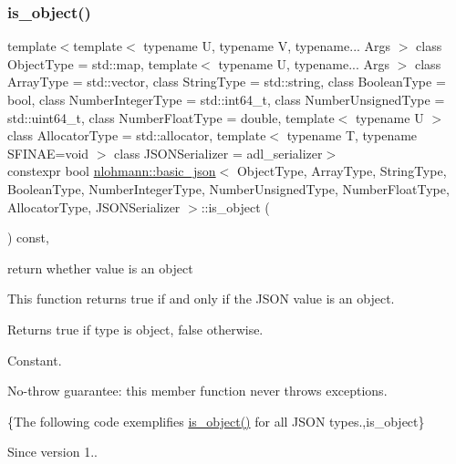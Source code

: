 \subsubsection{\texorpdfstring{is\+\_\+object()}{is\_object()}}
{\footnotesize\ttfamily template$<$template$<$ typename U, typename V, typename... Args $>$ class Object\+Type = std\+::map, template$<$ typename U, typename... Args $>$ class Array\+Type = std\+::vector, class String\+Type  = std\+::string, class Boolean\+Type  = bool, class Number\+Integer\+Type  = std\+::int64\+\_\+t, class Number\+Unsigned\+Type  = std\+::uint64\+\_\+t, class Number\+Float\+Type  = double, template$<$ typename U $>$ class Allocator\+Type = std\+::allocator, template$<$ typename T, typename S\+F\+I\+N\+A\+E=void $>$ class J\+S\+O\+N\+Serializer = adl\+\_\+serializer$>$ \\
constexpr bool \mbox{\hyperlink{classnlohmann_1_1basic__json}{nlohmann\+::basic\+\_\+json}}$<$ Object\+Type, Array\+Type, String\+Type, Boolean\+Type, Number\+Integer\+Type, Number\+Unsigned\+Type, Number\+Float\+Type, Allocator\+Type, J\+S\+O\+N\+Serializer $>$\+::is\+\_\+object (\begin{DoxyParamCaption}{ }\end{DoxyParamCaption}) const\hspace{0.3cm}{\ttfamily [inline]}, {\ttfamily [noexcept]}}



return whether value is an object 

This function returns true if and only if the J\+S\+ON value is an object.

\begin{DoxyReturn}{Returns}
{\ttfamily true} if type is object, {\ttfamily false} otherwise.
\end{DoxyReturn}
Constant.

No-\/throw guarantee\+: this member function never throws exceptions.

\{The following code exemplifies {\ttfamily \mbox{\hyperlink{classnlohmann_1_1basic__json_af8f511af124e82e4579f444b4175787c}{is\+\_\+object()}}} for all J\+S\+ON types.,is\+\_\+object\}

\begin{DoxySince}{Since}
version 1.. 
\end{DoxySince}
\mbox{\label{classnlohmann_1_1basic__json_a6362b88718eb5c6d4fed6a61eed44b95}} 

